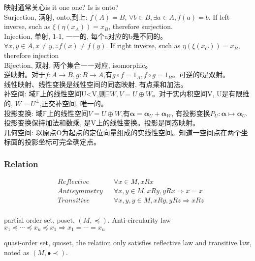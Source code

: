 \documentclass[UTF8]{../09-Mathematics}
\begin{document}
映射通常关心is it one one? Is is onto? \\
Surjection, 满射, onto,到上: $f(A)=B$, $\forall b \in B, \exists a \in A, f(a) = b$. If left inverse, such as $\xi (\eta (x_A)) = x_B$, therefore surjection.\\
Injection, 单射, 1-1, 一一的, 每个a对应的b是不同的。$\forall x, y \in A, x \neq y, \therefore f(x) \neq f(y)$. If right inverse, such as $ \eta (\xi (x_C)) = x_B$, therefore injection\\
Bijection, 双射, 两个集合一一对应, isomorphic。\\
逆映射。对于$f:A \to B, g: B \to A$,有$g \circ f =1_A, f \circ g =1_B$。可逆的f是双射。\\

线性映射、线性变换是线性空间的同态映射, 有点乘和加法。\\
补空间: 域$\mathbb F$上的线性空间U<V,则$\exists W, V=U \oplus W$。对于实内积空间V, U是有限维的, $W=U^{\perp}$,正交补空间, 唯一的。\\
投影变换: 域$\mathbb F$上的线性空间$V=U \oplus W$,有$\mathbf \alpha =\mathbf \alpha _U+\mathbf \alpha _W$, 有投影变换$P_U:\mathbf \alpha \mapsto \mathbf \alpha _U$.投影变换保持加法和数乘, 是V上的线性变换。投影是同态映射。\\
几何空间: 以原点O为起点的定位向量组成的实线性空间。知道一空间点在两个坐标面的投影坐标可完全确定点。




\subsubsection{Relation}

\begin{equation}
  \begin{aligned}
  &Reflective & & \forall x \in M, x R x\\
  &Antisymmetry & & \forall x,y \in M, x R y, yRx \Rightarrow x = x\\
  &Transitive & & \forall x,y,y \in M, x R y, y R z \Rightarrow x R z\\
  \end{aligned}
\end{equation}


partial order set, poset, $(M, \preceq )$. Anti-circularity law $x_1 \preceq \cdots \preceq x_n \preceq x_1  \Rightarrow x_1 = \cdots = x_n$

quasi-order set, quoset, the relation only satisfies reflective law and transitive law, noted as $(M, \bullet \prec )$.
\end{document}
